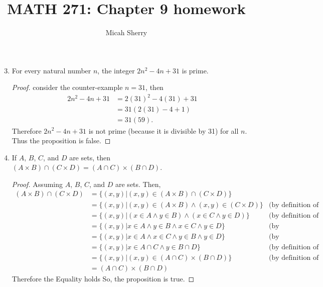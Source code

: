 \documentclass{article}
\title{MATH 271: Chapter 9 homework}
\author{Micah Sherry}
\newcommand{\nitem}[1] %
{
	\setcounter{enumi}{#1}
	\addtocounter{enumi}{-1}
	\item
}
\begin{document}
	\maketitle
	
	\begin{enumerate}
		\nitem{2} For every natural number $n$, the integer $2n^2-4n+31$ is prime.
		\begin{proof}
			consider the counter-example $n = 31 $, then 
			\begin{align*}
				2n^2-4n+31 &= 2(31)^2-4(31)+31\\
				&= 31(2(31)-4+1)\\
				&= 31(59).
			\end{align*}
			Therefore $2n^2-4n+31$ is not prime (because it is divisible by 31) for all $n$. Thus the proposition is false.
		\end{proof}
		
		\nitem{6} If $A$, $B$, $C$, and $D$ are sets, then $(A \times B)\cap(C \times D)=(A \cap C) \times (B \cap D)$.
		\begin{proof}
			Assuming $A$, $B$, $C$, and $D$ are sets. Then,
			\begin{align*}
				(A \times B)\cap(C \times D) &= \{(x,y)| (x,y) \in (A \times B)\cap(C \times D)\}\\
				&= \{(x,y)| (x,y) \in (A \times B) \wedge (x,y) \in (C \times D)\} 
				& \text{(by definition of intersection)}\\
				&= \{(x,y)| (x \in A \wedge y \in B) \wedge (x \in C \wedge y \in D)\} 
				& \text{(by definition of Cartesian product)}\\
				&= \{(x,y)| x \in A \wedge y \in B \wedge x \in C \wedge y \in D\} 
				& \text{(by Associativity)}\\
				&= \{(x,y)| x \in A \wedge x \in C \wedge y \in B \wedge y \in D\} 
				& \text{(by Commutativity)}\\
				&= \{(x,y)| x \in A \cap C \wedge y \in B \cap D\}
				& \text{(by definition of intersection)}\\
				&= \{(x,y)| (x,y) \in (A \cap C) \times (B \cap D) \}
				& \text{(by definition of Cartesian product)}\\
				&=	(A \cap C) \times (B \cap D)
			\end{align*}
			Therefore the Equality holds So, the proposition is true.
		\end{proof}
		

\end{enumerate}
\end{document}
